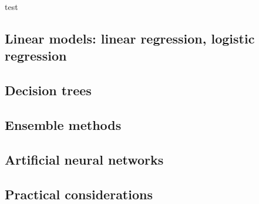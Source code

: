 
test

%

\subsection{Linear models: linear regression, logistic regression}

\subsection{Decision trees}

\subsection{Ensemble methods}

\subsection{Artificial neural networks}

\subsection{Practical considerations}